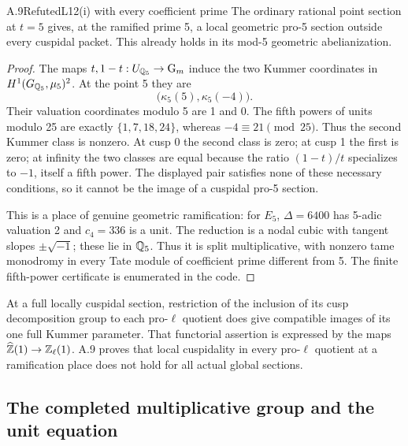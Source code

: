 \begin{statement}{A.9}{Refuted}{L12(i) with every coefficient prime}
The ordinary rational point section at $t=5$ gives, at the
ramified prime 5, a local geometric pro-5 section outside every
cuspidal packet. This already holds in its mod-5 geometric
abelianization.
\end{statement}
\begin{proof}
The maps $t,1-t:U_{\mathbb Q_5}\to\mathrm G_m$ induce the two Kummer coordinates
in $H^1(G_{\mathbb Q_5},\mu_5)^2$. At the point 5 they are
\[
                 \bigl(\kappa_5(5),\kappa_5(-4)\bigr).
\]
Their valuation coordinates modulo 5 are 1 and 0. The fifth powers
of units modulo 25 are exactly $\{1,7,18,24\}$, whereas
$-4\equiv21\pmod {25}$. Thus the second Kummer class is nonzero.
At cusp 0 the second class is zero; at cusp 1 the first is zero;
at infinity the two classes are equal because the ratio
$(1-t)/t$ specializes to $-1$, itself a fifth power.
The displayed pair satisfies none of these necessary conditions,
so it cannot be the image of a cuspidal pro-5 section.

This is a place of genuine geometric ramification: for $E_5$,
$\Delta=6400$ has 5-adic valuation 2 and $c_4=336$ is a unit.
The reduction is a nodal cubic with tangent slopes
$\pm\sqrt{-1}$; these lie in $\mathbb Q_5$. Thus it is split
multiplicative, with nonzero tame monodromy in every Tate module
of coefficient prime different from 5.
The finite fifth-power certificate is enumerated in the code.
\end{proof}
At a full locally cuspidal section, restriction of the inclusion of
its cusp decomposition group to each pro-$\ell$ quotient does give
compatible images of its one full Kummer parameter. That
functorial assertion is expressed by the maps
$\widehat{\mathbb Z}(1)\to\mathbb Z_\ell(1)$. A.9 proves that local cuspidality
in every pro-$\ell$ quotient at a ramification place does not
hold for all actual global sections.

\subsection{The completed multiplicative group and the unit equation}

